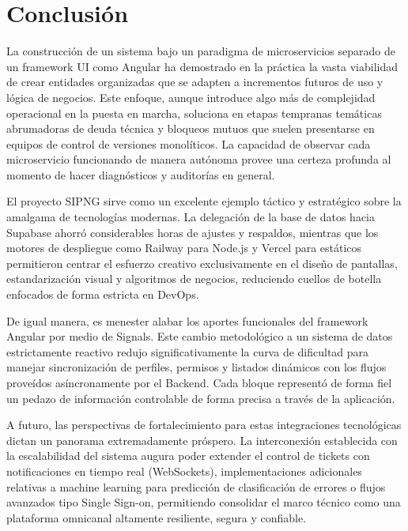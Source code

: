\documentclass[12pt,a4paper]{report}
\begin{document}
\chapter{Conclusión}

La construcción de un sistema bajo un paradigma de microservicios separado de un framework UI como Angular ha demostrado en la práctica la vasta viabilidad de crear entidades organizadas que se adapten a incrementos futuros de uso y lógica de negocios. Este enfoque, aunque introduce algo más de complejidad operacional en la puesta en marcha, soluciona en etapas tempranas temáticas abrumadoras de deuda técnica y bloqueos mutuos que suelen presentarse en equipos de control de versiones monolíticos. La capacidad de observar cada microservicio funcionando de manera autónoma provee una certeza profunda al momento de hacer diagnósticos y auditorías en general.

El proyecto SIPNG sirve como un excelente ejemplo táctico y estratégico sobre la amalgama de tecnologías modernas. La delegación de la base de datos hacia Supabase ahorró considerables horas de ajustes y respaldos, mientras que los motores de despliegue como Railway para Node.js y Vercel para estáticos permitieron centrar el esfuerzo creativo exclusivamente en el diseño de pantallas, estandarización visual y algoritmos de negocios, reduciendo cuellos de botella enfocados de forma estricta en DevOps.

De igual manera, es menester alabar los aportes funcionales del framework Angular por medio de Signals. Este cambio metodológico a un sistema de datos estrictamente reactivo redujo significativamente la curva de dificultad para manejar sincronización de perfiles, permisos y listados dinámicos con los flujos proveídos asíncronamente por el Backend. Cada bloque representó de forma fiel un pedazo de información controlable de forma precisa a través de la aplicación.

A futuro, las perspectivas de fortalecimiento para estas integraciones tecnológicas dictan un panorama extremadamente próspero. La interconexión establecida con la escalabilidad del sistema augura poder extender el control de tickets con notificaciones en tiempo real (WebSockets), implementaciones adicionales relativas a machine learning para predicción de clasificación de errores o flujos avanzados tipo Single Sign-on, permitiendo consolidar el marco técnico como una plataforma omnicanal altamente resiliente, segura y confiable.
\end{document}
